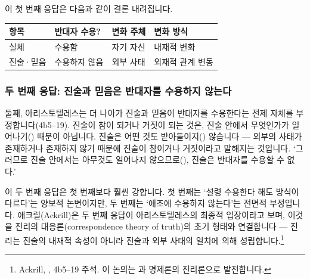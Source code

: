 \documentclass[12pt, a4paper]{article}
\begin{document}
이 첫 번째 응답은 다음과 같이 결론 내려집니다.


{%
\footnotesize
\setlength{\extrarowheight}{1.5pt}%
\renewcommand{\arraystretch}{1.1}%
\setlength{\tabcolsep}{4pt}%
%
\noindent\centering
\begin{tabular}{|>{\centering\arraybackslash}m{20mm}|>{\centering\arraybackslash}m{25mm}|>{\centering\arraybackslash}m{30mm}|>{\centering\arraybackslash}m{38mm}|}
\hline
\rowcolor{tableheadblue}
{\color{h1navy}\bfseries 항목} &
{\color{h1navy}\bfseries 반대자 수용?} &
{\color{h1navy}\bfseries 변화 주체} &
{\color{h1navy}\bfseries 변화 방식} \\ \hline
실체 & 수용함 & 자기 자신 & 내재적 변화 \\ \hline
진술·믿음 & 수용하지 않음 & 외부 사태 & 외재적 관계 변동 \\ \hline
\end{tabular}
\par
}

\subsubsection{두 번째 응답: 진술과 믿음은 반대자를 수용하지 않는다}

둘째, 아리스토텔레스는 더 나아가 진술과 믿음이 반대자를 수용한다는 전제 자체를 부정합니다(4b5--19). 진술이 참이 되거나 거짓이 되는 것은, 진술 안에서 무엇인가가 일어나기() 때문이 아닙니다. 진술은 어떤 것도 받아들이지() 않습니다 --- 외부의 사태가 존재하거나 존재하지 않기 때문에 진술이 참이거나 거짓이라고 말해지는 것입니다. `그러므로 진술 안에서는 아무것도 일어나지 않으므로(), 진술은 반대자를 수용할 수 없다.'

이 두 번째 응답은 첫 번째보다 훨씬 강합니다. 첫 번째는 `설령 수용한다 해도 방식이 다르다'는 양보적 논변이지만, 두 번째는 `애초에 수용하지 않는다'는 전면적 부정입니다. 애크릴(Ackrill)은 두 번째 응답이 아리스토텔레스의 최종적 입장이라고 보며, 이것을 진리의 대응론(correspondence theory of truth)의 초기 형태와 연결합니다 --- 진리는 진술의 내재적 속성이 아니라 진술과 외부 사태의 일치에 의해 성립합니다.\footnote{Ackrill, , 4b5--19 주석. 이 논의는 과 명제론의 진리론으로 발전합니다.}
\end{document}
